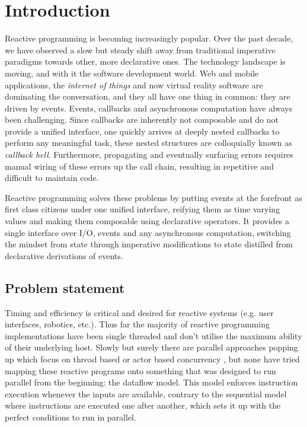 \chapter{Introduction}

Reactive programming is becoming increasingly popular. Over the past decade, we have observed a slow but steady shift away from traditional imperative paradigms towards other, more declarative ones.
The technology landscape is moving, and with it the software development world. Web and mobile applications, the \textit{internet of things} and now virtual reality software are dominating the conversation, and they all have one thing in common: they are driven by events. Events, callbacks and asynchronous computation have always been challenging. Since callbacks are inherently not composable and do not provide a unified interface, one quickly arrives at deeply nested callbacks to perform any meaningful task, these nested structures are colloquially known as \textit{callback hell}. Furthermore, propagating and eventually surfacing errors requires manual wiring of these errors up the call chain, resulting in repetitive and difficult to maintain code. 

Reactive programming solves these problems by putting events at the forefront as first class citizens under one unified interface, reifying them as time varying values and making them composable using declarative operators. It provides a single interface over I/O, events and any asynchronous computation, switching the mindset from state through imperative modifications to state distilled from declarative derivations of events. 

\section{Problem statement}

Timing and efficiency is critical and desired for reactive systems (e.g. user interfaces, robotics, etc.).
Thus far the majority of reactive programming implementations have been single threaded and don't utilise the maximum ability of their underlying host. Slowly but surely there are parallel approaches popping up which focus on thread based or actor based concurrency \citep{peterson_parallel_2000}, but none have tried mapping these reactive programs onto something that was designed to run parallel from the beginning: the dataflow model. This model enforces instruction execution whenever the inputs are available, contrary to the sequential model where instructions are executed one after another, which sets it up with the perfect conditions to run in parallel.

